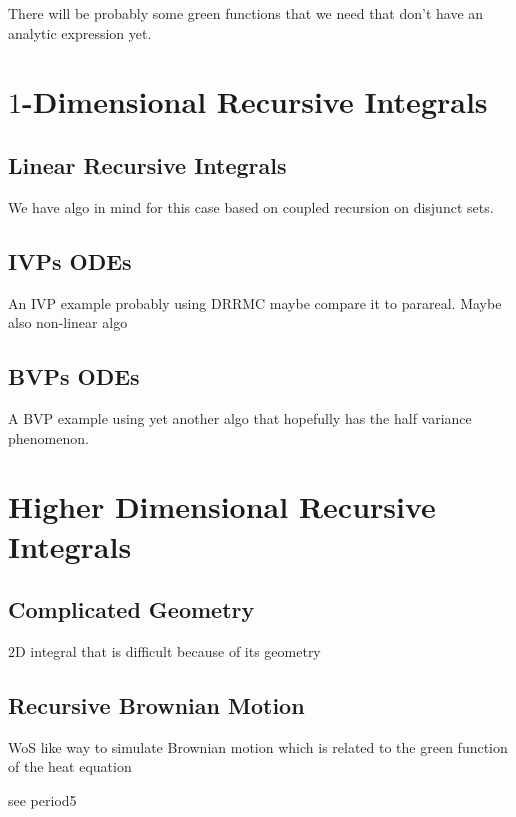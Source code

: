 \documentclass[a4paper,12pt]{article}
\begin{document}
\begin{example}
    There will be probably some green functions that we need
    that don't have an analytic expression yet.
\end{example}

\section{$1$-Dimensional Recursive Integrals}

\subsection{Linear Recursive Integrals}
We have algo in mind for this case based on coupled recursion on disjunct sets.


\subsection{IVPs ODEs}
An IVP example probably using DRRMC maybe compare it to parareal. Maybe also non-linear algo

\subsection{BVPs ODEs}
A BVP example using yet another algo that hopefully has the half variance phenomenon.

\section{Higher Dimensional Recursive Integrals}
\subsection{Complicated Geometry}
\begin{example}
    $2$D integral that is difficult because of its geometry
\end{example}

\subsection{Recursive Brownian Motion}
WoS like way to simulate Brownian motion which is related to the green function
of the heat equation

\begin{example}
    see period5
\end{example}
\end{document}
